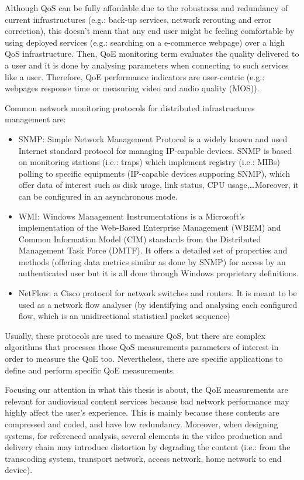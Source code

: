 Although QoS can be fully affordable due to the robustness and redundancy of current infrastructures (e.g.: back-up services, network rerouting and error correction), this doesn't mean that any end user might be feeling comfortable by using deployed services (e.g.: searching on a e-commerce webpage) over a high QoS infrastructure. Then, QoE monitoring term evaluates the quality delivered to a user and it is done by analysing parameters when connecting to such services like a user. Therefore, QoE performance indicators are user-centric (e.g.: webpages response time or measuring video and audio quality (MOS)).

Common network monitoring protocols for distributed infrastructures management are:

\begin{itemize}
\item SNMP: Simple Network Management Protocol is a widely known and used Internet standard protocol for managing IP-capable devices. SNMP is based on monitoring stations (i.e.: traps) which implement registry (i.e.: MIBs) polling to specific equipments (IP-capable devices supporing SNMP), which offer data of interest such as disk usage, link status, CPU usage,\ldots Moreover, it can be configured in an asynchronous mode.
\item WMI: Windows Management Instrumentations is a Microsoft's implementation of the Web-Based Enterprise Management (WBEM) and Common Information Model (CIM) standards from the Distributed Management Task Force (DMTF). It offers a detailed set of properties and methods (offering data metrics similar as done by SNMP) for access by an authenticated user but it is all done through Windows proprietary definitions.
\item NetFlow: a Cisco protocol for network switches and routers. It is meant to be used as a network flow analyser (by identifying and analysing each configured flow, which is an unidirectional statistical packet sequence) 
\end{itemize}  

Usually, these protocols are used to measure QoS, but there are complex algorithms that processes those QoS measurements parameters of interest in order to measure the QoE too. Nevertheless, there are specific applications to define and perform specific QoE measurements. 

Focusing our attention in what this thesis is about, the QoE measurements are relevant for audiovisual content services because bad network performance may highly affect the user's experience. This is mainly because these contents are compressed and coded, and have low redundancy. Moreover, when designing systems, for referenced analysis, several elements in the video production and delivery chain may introduce distortion by degrading the content (i.e.: from the transcoding system, transport network, access network, home network to end device).

